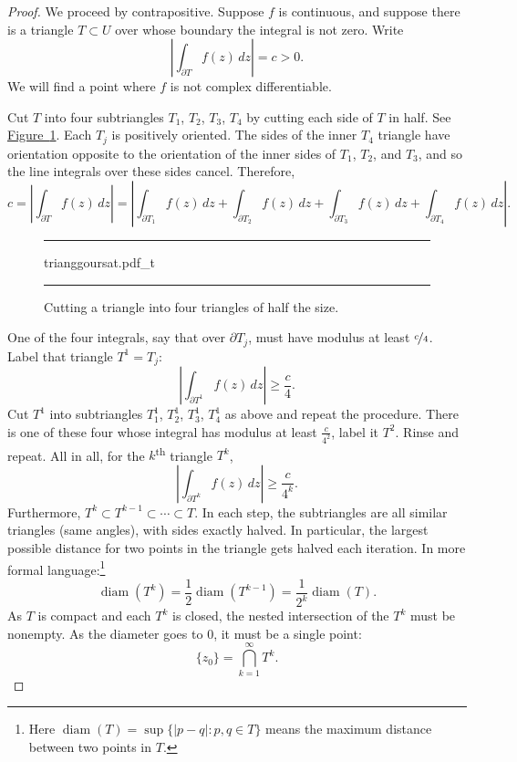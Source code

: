 \documentclass[12pt,openany]{book}
\newcommand{\sabs}[1]{\lvert {#1} \rvert}
\newcommand{\abs}[1]{\left\lvert {#1} \right\rvert}
\theoremstyle{plain}
\theoremstyle{remark}
\theoremstyle{definition}
\newenvironment{myfig}{%
\begin{figure}[h!t]
\noindent\rule{\textwidth}{0.5pt}\vspace{12pt}\par\centering}%
{\par\noindent\rule{\textwidth}{0.5pt}
\end{figure}}
\theoremstyle{exercise}
\theoremstyle{example}
\newcommand{\figureref}[1]{\hyperref[#1]{Figure~\ref*{#1}}}
\begin{document}
\begin{proof}
We proceed by contrapositive.
Suppose $f$ is continuous, and 
suppose there is a triangle $T \subset U$ over whose boundary the integral is not zero.
Write
\begin{equation*}
\abs{\int_{\partial T} f(z) \, dz} = c > 0 .
\end{equation*}
We will find a point
where $f$ is not complex differentiable.

Cut $T$ into four subtriangles
$T_1$, $T_2$, $T_3$, $T_4$ by cutting each side of $T$ in half.  See
\figureref{fig:trianggoursat}.
Each $T_j$ is positively oriented.
The sides of the inner $T_4$ triangle have orientation opposite
to the orientation of the inner sides of $T_1$, $T_2$, and $T_3$, and
so the line integrals over these sides cancel.  Therefore,
\begin{equation*}
c = 
\abs{\int_{\partial T} f(z) \, dz }
=
\abs{\int_{\partial T_1} f(z) \, dz 
+
\int_{\partial T_2} f(z) \, dz 
+
\int_{\partial T_3} f(z) \, dz 
+
\int_{\partial T_4} f(z) \, dz } .
\end{equation*}

\begin{myfig}
{trianggoursat.pdf_t}
\caption{Cutting a triangle into four triangles of half the size.%
\label{fig:trianggoursat}}
\end{myfig}

One of the four integrals, say that over $\partial T_j$,
must have modulus at least $\nicefrac{c}{4}$.  Label
that triangle $T^1 = T_j$:
\begin{equation*}
\abs{\int_{\partial T^1} f(z) \, dz } \geq \frac{c}{4} .
\end{equation*}
Cut $T^1$ into subtriangles
$T_1^1$, $T_2^1$, $T_3^1$, $T_4^1$ as above and repeat the procedure.  There
is one of these four whose integral has modulus at least $\frac{c}{4^2}$, label it
$T^2$.  Rinse and repeat.
All in all, for the $k$\textsuperscript{th} triangle $T^k$,
\begin{equation*}
\abs{\int_{\partial T^k} f(z) \, dz } \geq \frac{c}{4^k} .
\end{equation*}
Furthermore, $T^k \subset T^{k-1} \subset \cdots \subset T$.
In each step, the subtriangles are all similar triangles (same angles),
with sides exactly halved.
In particular,
the largest possible distance for two points in the triangle 
gets halved each iteration.
In more formal language:\footnote{%
Here $\operatorname{diam}(T)= \sup \{ \sabs{p-q} : p,q \in T \}$
means the maximum distance between two points in $T$.}
\begin{equation*}
\operatorname{diam}(T^k) =
\frac{1}{2} \operatorname{diam}(T^{k-1})
=
\frac{1}{2^k} \operatorname{diam}(T) .
\end{equation*}
As $T$ is compact and each $T^k$ is closed, the nested intersection of the $T^k$ must be nonempty.
As the diameter goes to $0$, it must be a single point:
\begin{equation*}
\{ z_0 \} = \bigcap_{k=1}^\infty T^k .
\end{equation*}


\end{proof}
\end{document}
